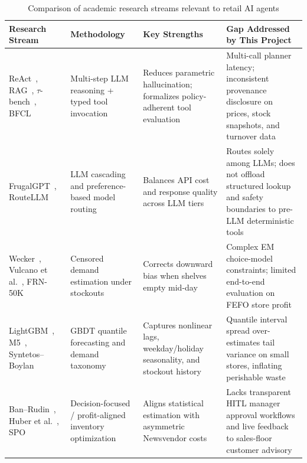 \begin{table}[H]
\centering
\caption{Comparison of academic research streams relevant to retail AI agents}
\label{tab:lit_comparison}
\footnotesize
\begin{tabularx}{\textwidth}{L{3.1cm} L{2.8cm} L{4.0cm} Y}
\toprule
\textbf{Research Stream} & \textbf{Methodology} & \textbf{Key Strengths} & \textbf{Gap Addressed by This Project} \\
\midrule
ReAct~\cite{yao2023react}, RAG~\cite{lewis2020rag}, $\tau$-bench~\cite{yao2024taubench}, BFCL~\cite{patil2024gorilla} & Multi-step LLM reasoning + typed tool invocation & Reduces parametric hallucination; formalizes policy-adherent tool evaluation & Multi-call planner latency; inconsistent provenance disclosure on prices, stock snapshots, and turnover data \\
FrugalGPT~\cite{chen2023frugalgpt}, RouteLLM~\cite{ong2024routellm} & LLM cascading and preference-based model routing & Balances API cost and response quality across LLM tiers & Routes solely among LLMs; does not offload structured lookup and safety boundaries to pre-LLM deterministic tools \\
Wecker~\cite{wecker1978stockouts}, Vulcano et al.~\cite{vulcano2012primary}, FRN-50K~\cite{freshretailnet50k} & Censored demand estimation under stockouts & Corrects downward bias when shelves empty mid-day & Complex EM choice-model constraints; limited end-to-end evaluation on FEFO store profit \\
LightGBM~\cite{ke2017lightgbm}, M5~\cite{makridakis2022m5}, Syntetos--Boylan~\cite{syntetos2005intermittent} & GBDT quantile forecasting and demand taxonomy & Captures nonlinear lags, weekday/holiday seasonality, and stockout history & Quantile interval spread over-estimates tail variance on small stores, inflating perishable waste \\
Ban--Rudin~\cite{ban2019bigdata}, Huber et al.~\cite{huber2019newsvendor}, SPO~\cite{elmachtoub2022spo} & Decision-focused / profit-aligned inventory optimization & Aligns statistical estimation with asymmetric Newsvendor costs & Lacks transparent HITL manager approval workflows and live feedback to sales-floor customer advisory \\
\bottomrule
\end{tabularx}
\end{table}

